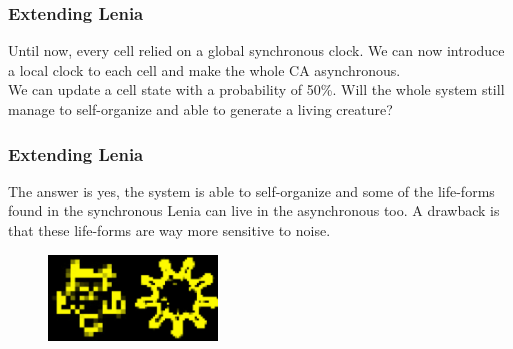 \documentclass{beamer}
\begin{document}
\begin{frame}
  \frametitle{Extending Lenia}
  Until now, every cell relied on a global synchronous clock. We can now
  introduce a local clock to each cell and make the whole CA asynchronous.\\
  We can update a cell state with a probability of 50\%. Will the whole system
  still manage to self-organize and able to generate a living creature?
\end{frame}

\begin{frame}
  \frametitle{Extending Lenia}
  The answer is yes, the system is able to self-organize and some of the
  life-forms found in the synchronous Lenia can live in the asynchronous too. A
  drawback is that these life-forms are way more sensitive to noise.
  \begin{figure}
    \begin{center}
      \includegraphics[width=0.4\textwidth]{./creatures_async.jpg}
    \end{center}
  \end{figure}

\end{frame}
\end{document}
